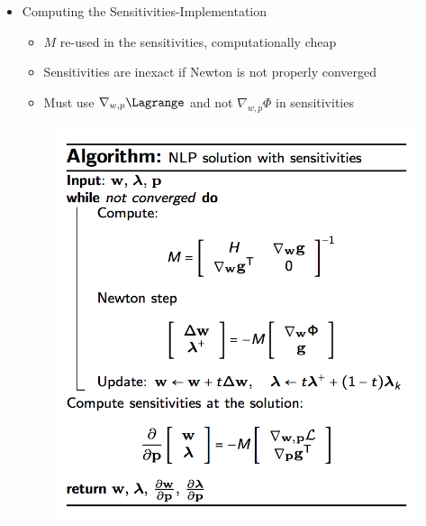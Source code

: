 \documentclass{article}
\theoremstyle{example}
\theoremstyle{definition}
\theoremstyle{assumption}
\theoremstyle{lemma}
\begin{document}
\begin{itemize}
			\item Computing the Sensitivities-Implementation 
				\begin{itemize}
					\item $M$ re-used in the sensitivities, computationally cheap
					\item Sensitivities are inexact if Newton is not properly converged
					\item Must use $\nabla_{w,p}\Lagrange$ and not $\nabla_{w,p}\Phi$ in sensitivities
				\end{itemize}
				\begin{figure}[H]
					\centering
					\includegraphics{NLP_newton}
				\end{figure}
	\end{itemize}
\end{document}
